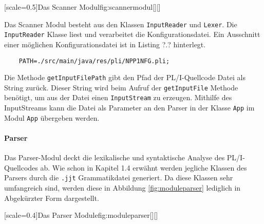 [scale=0.5]{Das Scanner Modul}{fig:scannermodul}[][]

Das Scanner Modul besteht aus den Klassen \verb+InputReader+ und \verb+Lexer+. 
Die \verb+InputReader+ Klasse liest und verarbeitet die Konfigurationsdatei. Ein Ausschnitt einer möglichen Konfigurationsdatei ist in Listing ?.? hinterlegt.

\begin{verbatim}
	PATH=./src/main/java/res/pli/NPP1NFG.pli;
\end{verbatim}

Die Methode \verb+getInputFilePath+ gibt den Pfad der PL/I-Quellcode Datei als String zurück.
Dieser String wird beim Aufruf der \verb+getInputFile+ Methode benötigt, um aus der Datei einen \verb+InputStream+ zu erzeugen.
Mithilfe des InputStreams kann die Datei als Parameter an den Parser in der Klasse \verb+App+ im Modul \verb+App+
übergeben werden. 


\paragraph{Parser}
Das Parser-Modul deckt die lexikalische und syntaktische Analyse des PL/I-Quellcodes ab.
Wie schon in Kapitel 1.4 erwähnt werden jegliche Klassen des Parsers durch die \verb+.jjt+ Grammatikdatei generiert. Da diese Klassen sehr umfangreich sind, werden diese in Abbildung \ref{fig:moduleparser} lediglich in Abgekürzter Form dargestellt. 

[scale=0.4]{Das Parser Module}{fig:moduleparser}[][]
\pagebreak

